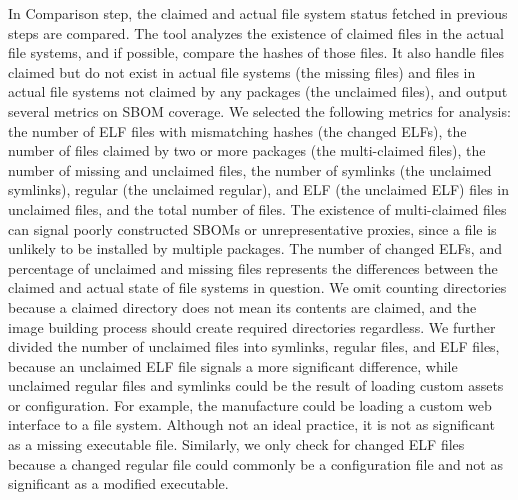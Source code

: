 In Comparison step, the claimed and actual file system status fetched in previous steps are compared. The tool analyzes the existence of claimed files in the actual file systems, and if possible, compare the hashes of those files. It also handle files claimed but do not exist in actual file systems (the missing files) and files in actual file systems not claimed by any packages (the unclaimed files), and output several metrics on SBOM coverage. We selected the following metrics for analysis: the number of ELF files with mismatching hashes (the changed ELFs), the number of files claimed by two or more packages (the multi-claimed files), the number of missing and unclaimed files, the number of symlinks (the unclaimed symlinks), regular (the unclaimed regular), and ELF (the unclaimed ELF) files in unclaimed files, and the total number of files. The existence of multi-claimed files can signal poorly constructed SBOMs or unrepresentative proxies, since a file is unlikely to be installed by multiple packages. The number of changed ELFs, and percentage of unclaimed and missing files represents the differences between the claimed and actual state of file systems in question. We omit counting directories because a claimed directory does not mean its contents are claimed, and the image building process should create required directories regardless. We further divided the number of unclaimed files into symlinks, regular files, and ELF files, because an unclaimed ELF file signals a more significant difference, while unclaimed regular files and symlinks could be the result of loading custom assets or configuration. For example, the manufacture could be loading a custom web interface to a file system. Although not an ideal practice, it is not as significant as a missing executable file. Similarly, we only check for changed ELF files because a changed regular file could commonly be a configuration file and not as significant as a modified executable.

